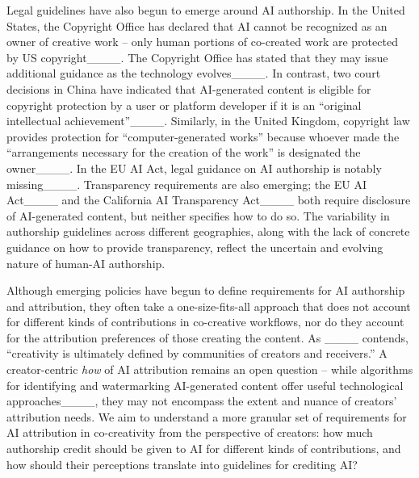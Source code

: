 Legal guidelines have also begun to emerge around AI authorship. In the United States, the Copyright Office has declared that AI cannot be recognized as an owner of creative work -- only human portions of co-created work are protected by US copyright____. The Copyright Office has stated that they may issue additional guidance as the technology evolves____. In contrast, two court decisions in China have indicated that AI-generated content is eligible for copyright protection by a user or platform developer if it is an ``original intellectual achievement''____. Similarly, in the United Kingdom, copyright law provides protection for ``computer-generated works'' because whoever made the ``arrangements necessary for the creation of the work'' is designated the owner____. In the EU AI Act, legal guidance on AI authorship is notably missing____. Transparency requirements are also emerging; the EU AI Act____ and the California AI Transparency Act____ both require disclosure of AI-generated content, but neither specifies how to do so. The variability in authorship guidelines across different geographies, along with the lack of concrete guidance on how to provide transparency, reflect the uncertain and evolving nature of human-AI authorship.

Although emerging policies have begun to define requirements for AI authorship and attribution, they often take a one-size-fits-all approach that does not account for different kinds of contributions in co-creative workflows, nor do they account for the attribution preferences of those creating the content. As ____ contends, ``creativity is ultimately defined by communities of creators and receivers.'' 
A creator-centric \emph{how} of AI attribution remains an open question -- while algorithms for identifying and watermarking AI-generated content offer useful technological approaches____, they may not encompass the extent and nuance of creators' attribution needs. We aim to understand a more granular set of requirements for AI attribution in co-creativity from the perspective of creators: how much authorship credit should be given to AI for different kinds of contributions, and how should their perceptions translate into guidelines for crediting AI?


